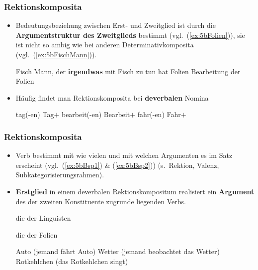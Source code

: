 \begin{frame}
\frametitle{Rektionskomposita}

\begin{itemize}
	\item Bedeutungsbeziehung zwischen Erst- und Zweitglied ist durch die \textbf{Argumentstruktur des Zweitglieds} bestimmt (vgl.\ (\ref{ex:5bFolien})), sie ist nicht so ambig wie bei anderen Determinativkomposita (vgl.\ (\ref{ex:5bFischMann})).
	
	\ea 
		\ea\label{ex:5bFischMann} Fisch \ras Mann, der \textbf{irgendwas} mit Fisch zu tun hat
		\ex\label{ex:5bFolien} Folien \ras Bearbeitung der Folien
		\z 	
	\z 
\end{itemize}

\begin{itemize}
	\item Häufig findet man Rektionskomposita bei \textbf{deverbalen} Nomina
	

	\ea 
		\ea tag(-en) \ras Tag$+$
		\ex bearbeit(-en) \ras Bearbeit$+$
		\ex fahr(-en) \ras Fahr$+$		
		\z 
	\z 
	
\end{itemize}


\end{frame}


\begin{frame}
\frametitle{Rektionskomposita}

\begin{itemize}
	
	\item Verb bestimmt mit wie vielen und mit welchen Argumenten es im Satz erscheint (vgl.\ (\ref{ex:5bBsp1}) \& (\ref{ex:5bBsp2})) (s.\ Rektion, Valenz, Subkategorisierungsrahmen).
	
	\item \textbf{Erstglied} in einem deverbalen Rektionskompositum realisiert ein \textbf{Argument} des der zweiten Konstituente zugrunde liegenden Verbs.

	\settowidth\jamwidth{[2 ArgumenteX]} 
	\ea \label{ex:5bBsp1} 
		\jambox{[1 Argument]}
		\ex die  der Linguisten 
		\ex {}
		\z 

	\ex \label{ex:5bBsp2} 
		\jambox{[2 Argumente]}
		\ex die  der Folien
		\ex {}
		\z 
	\z
	
	\ea	 
		\ea Auto (jemand fährt Auto)
		\ex Wetter (jemand beobachtet das Wetter)
		\ex Rotkehlchen (das Rotkehlchen singt)
		\z 
	\z
		 
\end{itemize}

\end{frame}


